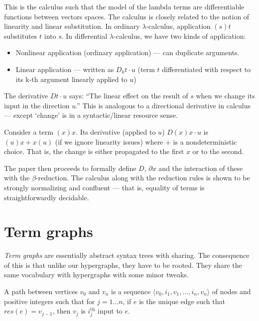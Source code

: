 \documentclass[acmsmall,screen, nonacm, anonymous]{acmart}
\begin{document}
This is the calculus such that the model of the lambda terms are differentiable functions between vectors spaces.
The calculus is closely related to the notion of linearity and linear substitution.
In ordinary $\lambda$-calculus, application $(s) t$ substitutes $t$ into $s$.
In differential $\lambda$-calculus, we have two kinds of application:
\begin{itemize}

\item Nonlinear application (ordinary application) --- can duplicate arguments.

\item Linear application --- written as $D_{k} t \cdot u$ (term $t$ differentiated with respect to its k-th argument linearly applied to $u$)

\end{itemize}
The derivative $D t \cdot u$ says: \enquote{The linear effect on the result of $s$ when we change its input in the direction $u$.}
This is analogous to a directional derivative in calculus --- except `change' is in a syntactic/linear resource sense.

\begin{example}
Consider a term $(x) x$.
Its derivative (applied to $u$) $D (x) x \cdot u$ is $(u) x + x (u)$ (if we ignore linearity issues) where $+$ is a nondeterministic choice.
That is, the change is either propagated to the first $x$ or to the second.
\end{example}

The paper then proceeds to formally define $D$, $\partial x$ and the interaction of these with the $\beta$-reduction.
The calculus along with the reduction rules is shown to be strongly normalizing and confluent --- that is, equality of terms is straightforwardly decidable.

\section{Term graphs}

\textit{Term graphs} are essentially abstract syntax trees with sharing.
The consequence of this is that unlike our hypergraphs, they have to be rooted.
They share the same vocabulary with hypergraphs with some minor tweaks.
\begin{definition}
  A path between vertices $v_0$ and $v_n$ is a sequence $\langle v_0, i_1, v_1, \ldots, i_n, v_n \rangle$ of nodes and positive integers such that for $j = 1 \ldots n$, if $e$ is the unique edge such that $res(e) = v_{j-1}$, then $v_j$ is $i^{\text{th}}_j$ input to $e$.
\end{definition}
\end{document}
